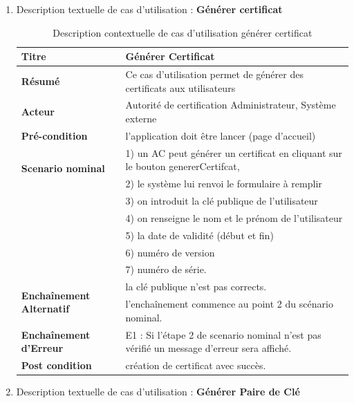 \begin{enumerate}
					\item Description textuelle de cas d'utilisation : \textbf{Générer certificat} 
					
					\begin{table}[H]
			
					\centering
					\caption{Description contextuelle de cas d'utilisation générer certificat}
					\begin{tabular}{|l|p{11cm}|}
					\hline 
						\textbf{Titre} & Générer Certificat \\ 
					\hline 
						\textbf{Résumé} & Ce cas d'utilisation permet de générer des certificats aux utilisateurs \\ 
					\hline 
						\textbf{Acteur} & Autorité de certification Administrateur, Système externe \\  
				
					\hline 
						\textbf{Pré-condition} & l'application doit être lancer (page d'accueil) \\ 
					\hline 
						\multirow{2}{*}{\textbf{Scenario nominal}} & 1) un AC peut générer un certificat en cliquant sur le bouton genererCertifcat, \\
							 & 2) le système lui renvoi le formulaire à remplir \\
							 & 3) on introduit la clé publique de l'utilisateur \\
							 & 4) on renseigne le nom et le prénom de l'utilisateur \\
							 & 5) la date de validité (début et fin)\\
							 & 6) numéro de version\\
							 &7) numéro de série. \\
					\hline 
					
						\multirow{2}{*}{\textbf{Enchaînement Alternatif}} & la clé publique n'est pas corrects. \\
							  & l'enchaînement commence au point 2 du scénario nominal. \\
							
					\hline 
						\textbf{Enchaînement d'Erreur} & E1 : Si l'étape 2 de scenario nominal n'est pas vérifié un message d'erreur sera affiché. \\
					\hline
						\textbf{Post condition} & création de certificat avec succès.\\
					\hline
			\end{tabular} 
		\end{table}
						\item Description textuelle de cas d'utilisation : \textbf{Générer Paire de Clé}
	

\end{enumerate}
